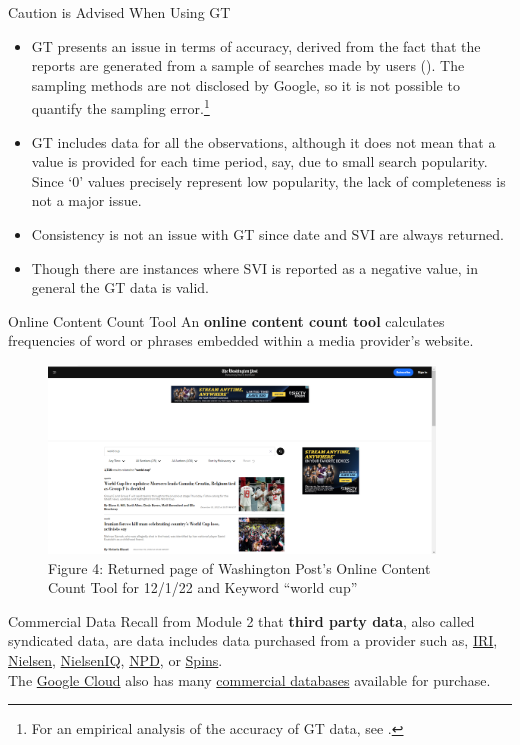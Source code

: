 \documentclass[pdf]{beamer}
\newcommand{\empr}[1]{{\color{franklinblue}\textbf{#1}}}
\theoremstyle{remark}
\theoremstyle{definition}
\begin{document}
\begin{frame}[t]{Caution is Advised When Using GT}
\small
\begin{itemize}
\item GT presents an issue in terms of accuracy, derived from the fact that the reports are generated from a sample of searches made by users (\cite{choi2012}). The sampling methods are not disclosed by Google, so it is not possible to quantify the sampling error.\footnote{For an empirical analysis of the accuracy of GT data, see \cite{cebrian2022}.} 
\item GT includes data for all the observations, although it does not mean that a value is provided for each time period, say, due to small search popularity. Since `0' values precisely represent low popularity, the lack of completeness is not a major issue.  
\item Consistency is not an issue with GT since date and SVI are always returned.
\item Though there are instances where SVI is reported as a negative value, in general the GT data is valid.
\end{itemize}
\end{frame}

\begin{frame}[t]{Online Content Count Tool}
An \empr{online content count tool} calculates frequencies of word or phrases embedded within a media provider's website.
\begin{figure}[htbp]
  \captionsetup{justification=centering}
  \includegraphics[height=5.0cm, trim=0.0cm 0.0cm 0.0cm 0.0cm width=5.0cm]{Images/Wash_Post_Content_Tool_120122.png}
  \caption{Figure {\color{franklinblue} 4}: Returned page of Washington Post's Online Content  \\ Count Tool for 12/1/22 and Keyword ``world cup''}
\end{figure}
\end{frame}

\begin{frame}[t]{Commercial Data}
Recall from Module 2 that \empr{third party data}, also called syndicated data, are data includes data purchased from a provider such as, \href{https://www.iriworldwide.com/en-us}{IRI}, \href{https://www.nielsen.com/}{Nielsen}, \href{https://nielseniq.com/global/en/}{NielsenIQ}, \href{https://www.npd.com/}{NPD}, or \href{https://www.spins.com/}{Spins}. \\
\vspace{1.5ex}
The \href{https://cloud.google.com/}{Google Cloud} also has many \href{https://cloud.google.com/datasets}{commercial databases} available for purchase. 
\end{frame}
\end{document}
